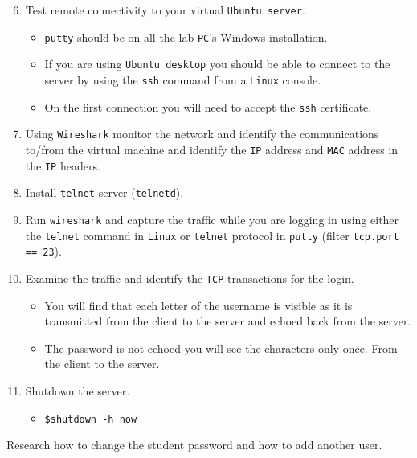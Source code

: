 \documentclass[11pt]{article}
\begin{document}
    \begin{enumerate}
        \setcounter{enumi}{5}
        \item Test remote connectivity to your virtual \texttt{Ubuntu server}.
            \begin{tcolorbox}[title={\textbf{Notes:}}]
                \begin{itemize}
                    \item \texttt{putty} should be on all the lab \texttt{PC}'s Windows installation.
                    \item If you are using \texttt{Ubuntu desktop} you should be able to connect to the server by using the \texttt{ssh} command from a \texttt{Linux} console.\\
                    \item On the first connection you will need to accept the \texttt{ssh} certificate.
                \end{itemize}
            \end{tcolorbox}
        \item Using \texttt{Wireshark} monitor the network and identify the communications to/from the virtual machine and identify the \texttt{IP} address and \texttt{MAC} address in the \texttt{IP} headers.
        \item Install \texttt{telnet} server (\texttt{telnetd}).
        \item Run \texttt{wireshark} and capture the traffic while you are logging in using either the \texttt{telnet} command in \texttt{Linux} or \texttt{telnet} protocol in \texttt{putty} (filter \texttt{tcp.port == 23}).
        \item Examine the traffic and identify the \texttt{TCP} transactions for the login.
            \begin{itemize}
                \item You will find that each letter of the username is visible as it is transmitted from the client to the server and echoed back from the server.
                \item The password is not echoed you will see the characters only once. From the client to the server.
            \end{itemize}
        \item Shutdown the server.
            \begin{itemize}
                \item \texttt{\$shutdown -h now}
            \end{itemize}
    \end{enumerate}
    \begin{tcolorbox}[title={\textbf{TIME PERMITTING:}}]
        Research how to change the student password and how to add another user.
    \end{tcolorbox}
\end{document}
